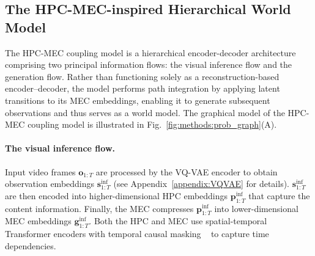 \subsection{The HPC-MEC-inspired Hierarchical World Model}
\label{methods:hippocampal_entorhinal_circuit}
The HPC-MEC coupling model is a hierarchical encoder-decoder architecture comprising two principal information flows: the visual inference flow and the generation flow.
Rather than functioning solely as a reconstruction-based encoder–decoder, the model performs path integration by applying latent transitions to its MEC embeddings, enabling it to generate subsequent observations and thus serves as a world model.
The graphical model of the HPC-MEC coupling model is illustrated in Fig.~\ref{fig:methods:prob_graph}(A).
\vspace{-0.2 cm}
\paragraph{The visual inference flow.}
Input video frames $\boldsymbol{o}_{1:T}$ are processed by the VQ-VAE encoder to obtain observation embeddings $\boldsymbol{s}_{1:T}^{\text{inf}}$ (see Appendix~\ref{appendix:VQVAE} for details).
$\boldsymbol{s}_{1:T}^{\text{inf}}$ are then encoded into higher-dimensional HPC embeddings $\boldsymbol{p}_{1:T}^{\text{inf}}$ that capture the content information.
Finally, the MEC compresses $\boldsymbol{p}_{1:T}^{\text{inf}}$ into lower-dimensional MEC embeddings $\boldsymbol{g}_{1:T}^{\text{inf}}$.
Both the HPC and MEC use spatial-temporal Transformer encoders with temporal causal masking ~\citep{yeLatentActionPretraining2024} to capture time dependencies.
\vspace{-0.2 cm}
